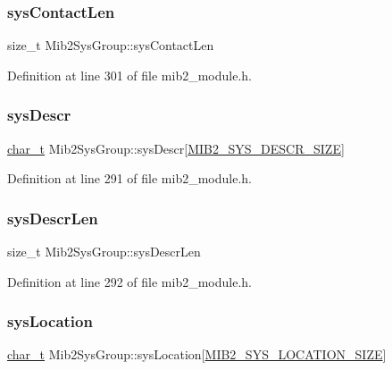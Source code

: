 \subsubsection{\texorpdfstring{sys\+Contact\+Len}{sysContactLen}}
{\footnotesize\ttfamily size\+\_\+t Mib2\+Sys\+Group\+::sys\+Contact\+Len}



Definition at line 301 of file mib2\+\_\+module.\+h.

\mbox{\label{structMib2SysGroup_aad04da4f826e381e4ab19101a5e4b421}} 
\subsubsection{\texorpdfstring{sys\+Descr}{sysDescr}}
{\footnotesize\ttfamily \hyperlink{compiler__port_8h_a40bb5262bf908c328fbcfbe5d29d0201}{char\+\_\+t} Mib2\+Sys\+Group\+::sys\+Descr\mbox{[}\hyperlink{mib2__module_8h_a3f91e2e53ad64eb89d3bbbd4861e4d1e}{M\+I\+B2\+\_\+\+S\+Y\+S\+\_\+\+D\+E\+S\+C\+R\+\_\+\+S\+I\+ZE}\mbox{]}}



Definition at line 291 of file mib2\+\_\+module.\+h.

\mbox{\label{structMib2SysGroup_a0fcf9584e1b90260ca11d99b062d7b22}} 
\subsubsection{\texorpdfstring{sys\+Descr\+Len}{sysDescrLen}}
{\footnotesize\ttfamily size\+\_\+t Mib2\+Sys\+Group\+::sys\+Descr\+Len}



Definition at line 292 of file mib2\+\_\+module.\+h.

\mbox{\label{structMib2SysGroup_a491246f50a9ef79544e093fb24ab41b6}} 
\subsubsection{\texorpdfstring{sys\+Location}{sysLocation}}
{\footnotesize\ttfamily \hyperlink{compiler__port_8h_a40bb5262bf908c328fbcfbe5d29d0201}{char\+\_\+t} Mib2\+Sys\+Group\+::sys\+Location\mbox{[}\hyperlink{mib2__module_8h_a306cbd004278f136741a30eb626b0387}{M\+I\+B2\+\_\+\+S\+Y\+S\+\_\+\+L\+O\+C\+A\+T\+I\+O\+N\+\_\+\+S\+I\+ZE}\mbox{]}}



